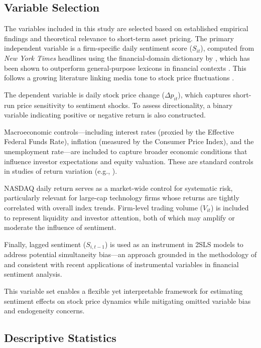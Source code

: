\documentclass[12pt]{article}
\begin{document}
\subsection{Variable Selection}
\label{sec:variable}

The variables included in this study are selected based on established empirical findings and theoretical relevance to short-term asset pricing. The primary independent variable is a firm-specific daily sentiment score ($S_{it}$), computed from \textit{New York Times} headlines using the financial-domain dictionary by \citet{loughran2011}, which has been shown to outperform general-purpose lexicons in financial contexts \citep{xiao2023}. This follows a growing literature linking media tone to stock price fluctuations \citep{tetlock2007giving, cristescu2023wavelet}.

The dependent variable is daily stock price change ($\Delta p_{it}$), which captures short-run price sensitivity to sentiment shocks. To assess directionality, a binary variable indicating positive or negative return is also constructed.

Macroeconomic controls—including interest rates (proxied by the Effective Federal Funds Rate), inflation (measured by the Consumer Price Index), and the unemployment rate—are included to capture broader economic conditions that influence investor expectations and equity valuation. These are standard controls in studies of return variation (e.g., \citealt{fama1990}).

NASDAQ daily return serves as a market-wide control for systematic risk, particularly relevant for large-cap technology firms whose returns are tightly correlated with overall index trends. Firm-level trading volume ($V_{it}$) is included to represent liquidity and investor attention, both of which may amplify or moderate the influence of sentiment.

Finally, lagged sentiment ($S_{i,t-1}$) is used as an instrument in 2SLS models to address potential simultaneity bias—an approach grounded in the methodology of \citet{tetlock2007giving} and consistent with recent applications of instrumental variables in financial sentiment analysis.

This variable set enables a flexible yet interpretable framework for estimating sentiment effects on stock price dynamics while mitigating omitted variable bias and endogeneity concerns.

\subsection{Descriptive Statistics}
\label{sec:Descriptive}
\end{document}

